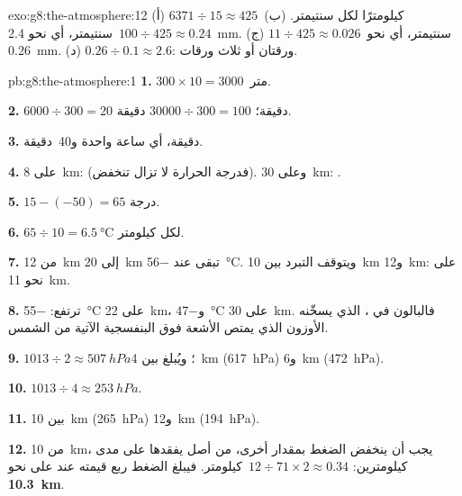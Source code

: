 \begin{solution}{exo:g8:the-atmosphere:12}
(أ) $6371 \div 15 \approx 425$~كيلومترًا لكل سنتيمتر. (ب) $100 \div 425
\approx 0.24$~سنتيمتر، أي نحو \qty{2.4}{mm}. (ج) $11 \div 425 \approx
0.026$~سنتيمتر، أي نحو \qty{0.26}{mm}. (د) $0.26 \div 0.1 \approx 2.6$: ورقتان
أو ثلاث ورقات.
\end{solution}

\begin{solution}{pb:g8:the-atmosphere:1}
\textbf{1.} $300 \times 10 = 3000$~متر.

\textbf{2.} $6000 \div 300 = 20$ دقيقة؛ $\num{30000} \div 300 = 100$
دقيقة.

\textbf{3.}  دقيقة، أي ساعة واحدة و40~دقيقة.

\textbf{4.} على  \qty{8}{km}:  (فدرجة الحرارة لا تزال
تنخفض). وعلى  \qty{30}{km}: .

\textbf{5.} $15 - (-50) = 65$ درجة.

\textbf{6.} $65 \div 10 = \qty{6.5}{\degreeCelsius}$ لكل كيلومتر.

\textbf{7.} من \qty{12}{km} إلى \qty{20}{km} تبقى عند
\qty{-56}{\degreeCelsius}. ويتوقف التبرد بين \qty{10}{km}
و\qty{12}{km}:  على  نحو \qty{11}{km}.

\textbf{8.} ترتفع: \qty{-55}{\degreeCelsius} على  \qty{22}{km}،
و\qty{-47}{\degreeCelsius} على  \qty{30}{km}. فالبالون في
، الذي يسخّنه الأوزون الذي يمتص الأشعة فوق البنفسجية الآتية
من الشمس.

\textbf{9.} $1013 \div 2 \approx \qty{507}{hPa}$؛ ويُبلغ بين
\qty{4}{km} (\qty{617}{hPa}) و\qty{6}{km} (\qty{472}{hPa}).

\textbf{10.} $1013 \div 4 \approx \qty{253}{hPa}$.

\textbf{11.} بين \qty{10}{km} (\qty{265}{hPa}) و\qty{12}{km}
(\qty{194}{hPa}).

\textbf{12.} من \qty{10}{km}، يجب أن ينخفض الضغط بمقدار  أخرى، من أصل  يفقدها على مدى كيلومترين: $12 \div 71 \times 2
\approx 0.34$~كيلومتر. فيبلغ الضغط ربع قيمته عند  على
 نحو \textbf{\qty{10.3}{km}}.
\end{solution}
